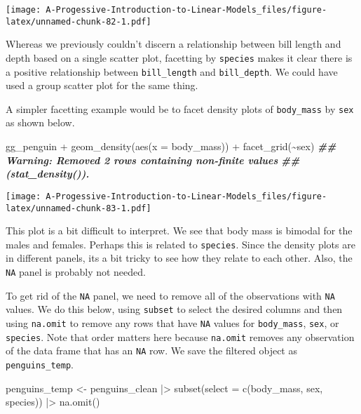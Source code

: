 \documentclass[
]{book}
\newenvironment{Shaded}{\begin{snugshade}}{\end{snugshade}}
\newcommand{\AttributeTok}[1]{\textcolor[rgb]{0.77,0.63,0.00}{#1}}
\newcommand{\DocumentationTok}[1]{\textcolor[rgb]{0.56,0.35,0.01}{\textbf{\textit{#1}}}}
\newcommand{\FunctionTok}[1]{\textcolor[rgb]{0.00,0.00,0.00}{#1}}
\newcommand{\NormalTok}[1]{#1}
\newcommand{\OtherTok}[1]{\textcolor[rgb]{0.56,0.35,0.01}{#1}}
\newcommand{\SpecialCharTok}[1]{\textcolor[rgb]{0.00,0.00,0.00}{#1}}
\theoremstyle{definition}
\theoremstyle{definition}
\theoremstyle{definition}
\theoremstyle{definition}
\theoremstyle{remark}
\begin{document}
\texttt{[image: A-Progessive-Introduction-to-Linear-Models\_files/figure-latex/unnamed-chunk-82-1.pdf]}

Whereas we previously couldn't discern a relationship between bill length and depth based on a single scatter plot, facetting by \texttt{species} makes it clear there is a positive relationship between \texttt{bill\_length} and \texttt{bill\_depth}. We could have used a group scatter plot for the same thing.

A simpler facetting example would be to facet density plots of \texttt{body\_mass} by \texttt{sex} as shown below.

\begin{Shaded}
\begin{Highlighting}[]
\NormalTok{gg\_penguin }\SpecialCharTok{+} \FunctionTok{geom\_density}\NormalTok{(}\FunctionTok{aes}\NormalTok{(}\AttributeTok{x =}\NormalTok{ body\_mass)) }\SpecialCharTok{+} \FunctionTok{facet\_grid}\NormalTok{(}\SpecialCharTok{\textasciitilde{}}\NormalTok{sex)}
\DocumentationTok{\#\# Warning: Removed 2 rows containing non{-}finite values}
\DocumentationTok{\#\# (\textasciigrave{}stat\_density()\textasciigrave{}).}
\end{Highlighting}
\end{Shaded}

\texttt{[image: A-Progessive-Introduction-to-Linear-Models\_files/figure-latex/unnamed-chunk-83-1.pdf]}

This plot is a bit difficult to interpret. We see that body mass is bimodal for the males and females. Perhaps this is related to \texttt{species}. Since the density plots are in different panels, its a bit tricky to see how they relate to each other. Also, the \texttt{NA} panel is probably not needed.

To get rid of the \texttt{NA} panel, we need to remove all of the observations with \texttt{NA} values. We do this below, using \texttt{subset} to select the desired columns and then using \texttt{na.omit} to remove any rows that have \texttt{NA} values for \texttt{body\_mass}, \texttt{sex}, or \texttt{species}. Note that order matters here because \texttt{na.omit} removes any observation of the data frame that has an \texttt{NA} row. We save the filtered object as \texttt{penguins\_temp}.

\begin{Shaded}
\begin{Highlighting}[]
\NormalTok{penguins\_temp }\OtherTok{\textless{}{-}}
\NormalTok{  penguins\_clean }\SpecialCharTok{|\textgreater{}}
  \FunctionTok{subset}\NormalTok{(}\AttributeTok{select =} \FunctionTok{c}\NormalTok{(body\_mass, sex, species)) }\SpecialCharTok{|\textgreater{}}
  \FunctionTok{na.omit}\NormalTok{()}
\end{Highlighting}
\end{Shaded}
\end{document}
